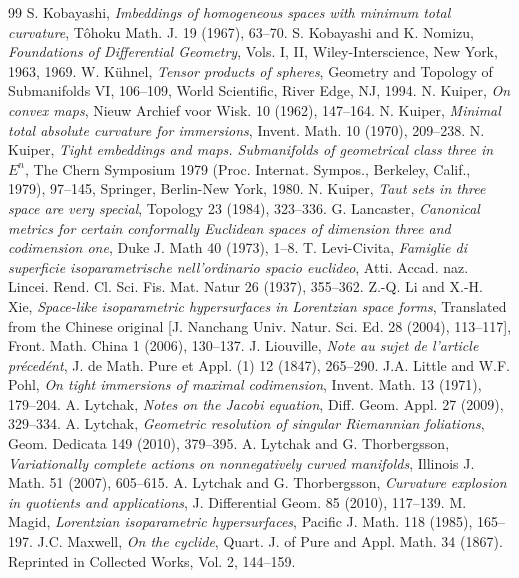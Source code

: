 \documentclass[12pt]{article}
\begin{document}
{\begin{thebibliography}{99}
S. Kobayashi, {\em Imbeddings of homogeneous spaces
with minimum total curvature}, T\^{o}hoku Math. J. 19 (1967), 63--70.
  S. Kobayashi and K. Nomizu, {\em Foundations of Differential
Geometry}, Vols. I, II, Wiley-Interscience, New York, 1963, 1969.
W. K\"{u}hnel, {\em Tensor products of spheres},
Geometry and Topology of Submanifolds VI, 106--109, World
Scientific, River Edge, NJ, 1994.
 N. Kuiper, {\em On convex maps}, Nieuw Archief
voor Wisk. 10 (1962), 147--164.
 N. Kuiper, {\em Minimal total
absolute curvature for immersions}, Invent. Math. 10 (1970), 209--238.
 N. Kuiper, {\em Tight embeddings
and maps.  Submanifolds of geometrical class three in} $E^n$,
The Chern Symposium 1979 (Proc. Internat. Sympos., Berkeley,
Calif., 1979), 97--145, Springer, Berlin-New York, 1980.   
 N. Kuiper, {\em Taut sets 
in three space are very
special}, Topology 23 (1984), 323--336.
 G. Lancaster, {\em Canonical metrics for certain
conformally Euclidean spaces of dimension three and
codimension one}, Duke J. Math 40 (1973), 1--8.
 T. Levi-Civita, {\em Famiglie di superficie
isoparametrische nell'ordinario spacio euclideo}, Atti.
Accad. naz. Lincei. Rend. Cl. Sci. Fis. Mat. Natur 26 (1937),
355--362.
 Z.-Q. Li and X.-H. Xie, {\em Space-like isoparametric hypersurfaces in Lorentzian space forms},
Translated from the Chinese original [J. Nanchang Univ. Natur. Sci. Ed. 28 (2004), 113--117],
Front. Math. China 1 (2006), 130--137.
 J. Liouville, {\em Note au sujet de l'article
pr\'{e}ced\'{e}nt}, J. de Math. Pure et Appl. (1) 12 (1847), 265--290.
J.A. Little and W.F. Pohl, {\em On tight immersions of
maximal codimension}, Invent. Math. 13 (1971), 179--204.
 A. Lytchak, {\em Notes on the Jacobi equation}, Diff. Geom. Appl. 27 (2009), 329--334.
 A. Lytchak, {\em Geometric resolution of singular Riemannian foliations}, Geom. Dedicata 149 (2010), 379--395.
 A. Lytchak and G. Thorbergsson, {\em Variationally complete actions on nonnegatively curved manifolds}, Illinois J. Math. 51 (2007), 605--615.
 A. Lytchak and G. Thorbergsson, {\em Curvature explosion in quotients and applications}, J. Differential Geom. 85 (2010), 117--139.
 M. Magid, {\em Lorentzian isoparametric hypersurfaces},
Pacific J. Math. 118 (1985), 165--197.
 J.C. Maxwell, {\em On the cyclide}, Quart. J. of
Pure and Appl. Math. 34 (1867).  Reprinted in Collected Works,
Vol. 2, 144--159.

\end{thebibliography}}
\end{document}
